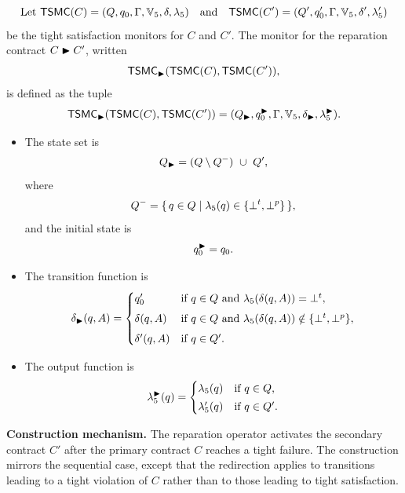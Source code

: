 \begin{definition}
\label{def:moore-repair}
\[\text{Let }
\mathsf{TSMC}(C)  = (Q, q_0, \Gamma, \mathbb{V}_5 , \delta, \lambda_5)
\quad\text{and}\quad
\mathsf{TSMC}(C') = (Q', q'_0, \Gamma, \mathbb{V}_5 , \delta', \lambda'_5)
\]
be the tight satisfaction monitors for $C$ and $C'$.  
The monitor for the reparation contract $C\blacktriangleright C'$, written
\[
\mathsf{TSMC}_{\blacktriangleright}(\mathsf{TSMC}(C),\mathsf{TSMC}(C')),
\]
is defined as the tuple
\[
\mathsf{TSMC}_{\blacktriangleright}(\mathsf{TSMC}(C),\mathsf{TSMC}(C'))
  = (Q_{\blacktriangleright}, q_0^{\blacktriangleright}, \Gamma, \mathbb{V}_5 , \delta_{\blacktriangleright}, \lambda_5^{\blacktriangleright}).
\]

\begin{itemize}
  \item The state set is
  \[
    Q_{\blacktriangleright} = (Q \setminus Q^{-})\ \cup\ Q',
  \]
  where
  \[
    Q^{-} = \{\,q \in Q \mid \lambda_5(q) \in \{\bot^t,\bot^p\}\,\},
  \]
  and the initial state is
  \[
    q_0^{\blacktriangleright} = q_0.
  \]

  \item The transition function is
  \[
    \delta_{\blacktriangleright}(q,A)=
    \begin{cases}
      q'_0
        & \text{if } q\in Q \text{ and } \lambda_5(\delta(q,A))=\bot^t,\\[4pt]
      \delta(q,A)
        & \text{if } q\in Q \text{ and } \lambda_5(\delta(q,A))\notin\{\bot^t,\bot^p\},\\[4pt]
      \delta'(q,A)
        & \text{if } q\in Q'.\\
    \end{cases}
  \]

  \item The output function is
  \[
     \lambda_5^{\blacktriangleright}(q)=
     \begin{cases}
       \lambda_5(q)   & \text{if } q\in Q,\\[2pt]
       \lambda'_5(q)  & \text{if } q\in Q'.\\
     \end{cases}
  \]
\end{itemize}
\end{definition}


\noindent
\textbf{Construction mechanism.}
The reparation operator activates the secondary contract $C'$ after the primary contract $C$ reaches a tight failure. The construction mirrors the sequential case, except that the redirection applies to transitions leading to a tight violation of $C$ rather than to those leading to tight satisfaction.

